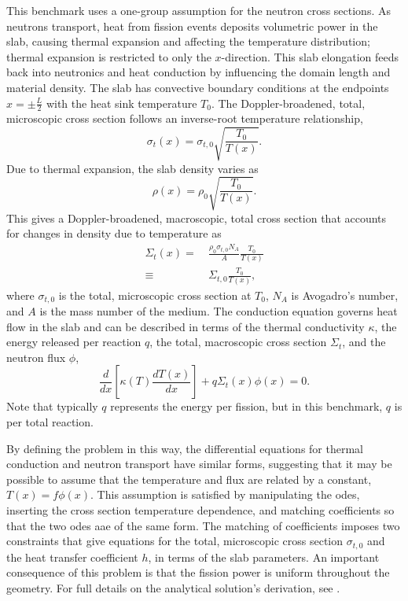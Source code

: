 \documentclass[letterpaper]{mc2023}
\begin{document}
This benchmark uses a one-group assumption for the neutron cross sections. As neutrons transport, heat from fission events deposits
volumetric power in the slab, causing thermal expansion and affecting the temperature distribution; thermal expansion is restricted
to only the $x$-direction. This slab elongation feeds back into neutronics and heat conduction by influencing the domain length and
material density. The slab has convective boundary conditions at the endpoints $x=\pm \frac{L}{2}$ with the heat sink temperature
$T_{0}$. The Doppler-broadened, total, microscopic cross section follows an inverse-root temperature relationship,
\begin{equation}
    \sigma_{t}(x) = \sigma_{t,0}\sqrt{\frac{T_{0}}{T(x)}}.
\end{equation}
Due to thermal expansion, the slab density varies as
\begin{equation} \label{sec:intro:density}
    \rho(x) =  \rho_{0} \sqrt{\frac{T_{0}}{T(x)}}.
\end{equation}
This gives a Doppler-broadened, macroscopic, total cross section that accounts for changes in density due to temperature as
\begin{equation}\begin{aligned} \label{sec:intro:doppler}
    \Sigma_{t}(x) =&\  \frac{\rho_{0}\sigma_{t,0} N_{A}}{A} \frac{T_{0}}{T(x)}\\
    \equiv&\  \Sigma_{t,0}\frac{T_{0}}{T(x)} ,
\end{aligned}\end{equation}
where $ \sigma_{t,0}$ is the total, microscopic cross section at $T_{0}$, $N_{A}$ is Avogadro's number, and $A$ is the mass number
of the medium. The conduction equation governs heat flow in the slab and can be described in terms of the thermal conductivity
$\kappa$, the energy released per reaction $q$, the total, macroscopic cross section $\Sigma_{t}$, and the neutron flux $\phi$,
\begin{equation}
     \frac{d}{dx}\left\lbrack\kappa(T)\frac{dT(x)}{dx}\right\rbrack + q \Sigma_{t}(x)\phi(x) = 0.
\end{equation}
Note that typically $q$ represents the energy per fission, but in this benchmark, $q$ is per total reaction.

By defining the problem in this way, the differential equations for thermal conduction and neutron transport have similar forms,
suggesting that it may be possible to assume that the temperature and flux are related by a constant, $T(x)=f\phi(x)$. This
assumption is satisfied by manipulating the \glspl{ode}, inserting the cross section temperature dependence, and matching
coefficients so that the two \glspl{ode} aae of the same form. The matching of coefficients imposes two constraints that give
equations for the total, microscopic cross section $\sigma_{t,0}$ and the heat transfer coefficient $h$, in terms of the slab
parameters. An important consequence of this problem is that the fission power is uniform throughout the geometry. For full
details on the analytical solution's derivation, see \cite{analytical-benchmark}.
\end{document}
